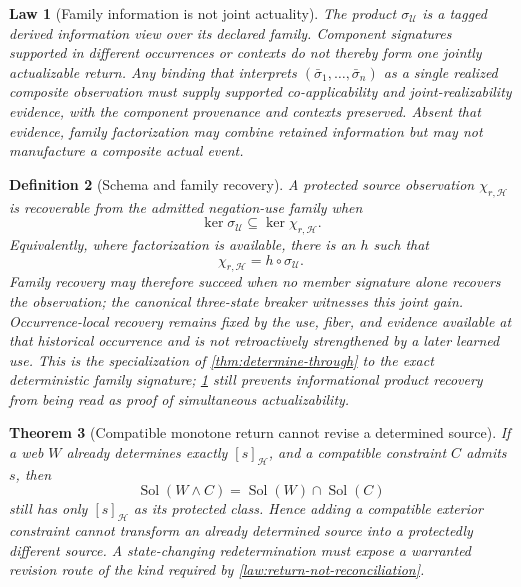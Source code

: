 \documentclass[11pt,oneside]{article}
\newtheorem{definition}{Definition}[section]
\newtheorem{law}[definition]{Law}
\newtheorem{theorem}[definition]{Theorem}
\begin{document}
\begin{law}[Family information is not joint actuality]\label{law:family-jointness}
The product \(\sigma_{\mathcal U}\) is a tagged derived information view over its
declared family.  Component signatures supported in different occurrences or
contexts do not thereby form one jointly actualizable return.  Any binding that
interprets \((\bar\sigma_1,\ldots,\bar\sigma_n)\) as a single realized composite
observation must supply supported co-applicability and joint-realizability evidence,
with the component provenance and contexts preserved.  Absent that evidence, family
factorization may combine retained information but may not manufacture a composite
actual event.
\end{law}

\begin{definition}[Schema and family recovery]\label{def:family-recovery}
A protected source observation \(\chi_{r,\mathcal H}\) is recoverable from the admitted negation-use family when
\[
\boxed{
\ker\sigma_{\mathcal U}
\subseteq
\ker\chi_{r,\mathcal H}.
}
\]
Equivalently, where factorization is available, there is an \(h\) such that
\[
\boxed{
\chi_{r,\mathcal H}=h\circ\sigma_{\mathcal U}.
}
\]
Family recovery may therefore succeed when no member signature alone recovers the observation; the canonical three-state breaker witnesses this joint gain.  Occurrence-local recovery remains fixed by the use, fiber, and evidence available at that historical occurrence and is not retroactively strengthened by a later learned use.
This is the specialization of \cref{thm:determine-through} to the exact deterministic
family signature; \cref{law:family-jointness} still prevents informational product
recovery from being read as proof of simultaneous actualizability.
\end{definition}

\begin{theorem}[Compatible monotone return cannot revise a determined source]\label{thm:monotone-return}
If a web \(W\) already determines exactly \([s]_{\mathcal H}\), and a compatible constraint \(C\) admits \(s\), then
\[
\operatorname{Sol}(W\land C)
=
\operatorname{Sol}(W)\cap\operatorname{Sol}(C)
\]
still has only \([s]_{\mathcal H}\) as its protected class.  Hence adding a compatible exterior constraint cannot transform an already determined source into a protectedly different source.  A state-changing redetermination must expose a warranted revision route of the kind required by \cref{law:return-not-reconciliation}.
\end{theorem}
\end{document}
